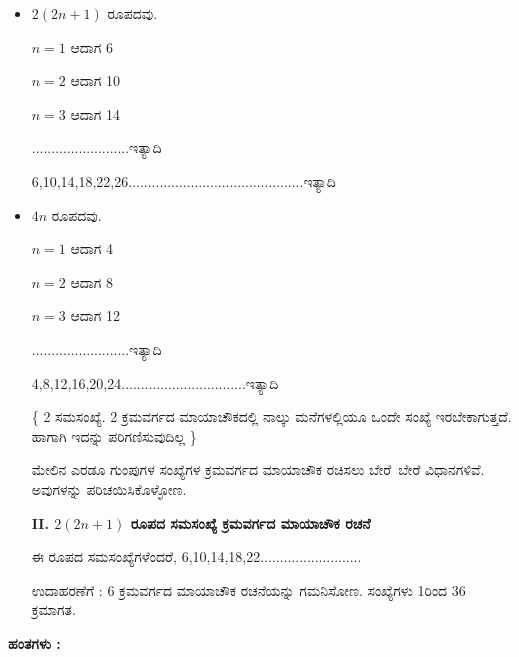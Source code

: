 \begin{itemize}
	\item $2 (2n+1)$ ರೂಪದವು.

	$n=1$ ಆದಾಗ 6

	$n=2$ ಆದಾಗ 10

	$n=3$ ಆದಾಗ 14

	.........................ಇತ್ಯಾದಿ

	6,10,14,18,22,26.............................................ಇತ್ಯಾದಿ
	\item $4n$ ರೂಪದವು. 

	$n=1$ ಆದಾಗ 4

	$n=2$ ಆದಾಗ 8

	$n=3$ ಆದಾಗ 12

	.........................ಇತ್ಯಾದಿ

	4,8,12,16,20,24................................ಇತ್ಯಾದಿ

	\{ 2 ಸಮಸಂಖ್ಯೆ. 2 ಕ್ರಮವರ್ಗದ ಮಾಯಾಚೌಕದಲ್ಲಿ ನಾಲ್ಕು ಮನೆಗಳಲ್ಲಿಯೂ ಒಂದೇ ಸಂಖ್ಯೆ ಇರಬೇಕಾಗುತ್ತದೆ. ಹಾಗಾಗಿ ಇದನ್ನು ಪರಿಗಣಿಸುವುದಿಲ್ಲ \}

	ಮೇಲಿನ ಎರಡೂ ಗುಂಪುಗಳ ಸಂಖ್ಯೆಗಳ ಕ್ರಮವರ್ಗದ ಮಾಯಾಚೌಕ ರಚಿಸಲು \hbox{ಬೇರೆ ಬೇರೆ} ವಿಧಾನಗಳಿವೆ. ಅವುಗಳನ್ನು ಪರಿಚಯಿಸಿಕೊಳ್ಳೋಣ.

	\textbf{II. $2 (2n+1)$ ರೂಪದ ಸಮಸಂಖ್ಯೆ  ಕ್ರಮವರ್ಗದ ಮಾಯಾಚೌಕ ರಚನೆ}

	ಈ ರೂಪದ ಸಮಸಂಖ್ಯೆಗಳೆಂದರೆ, 6,10,14,18,22..........................

	ಉದಾಹರಣೆಗೆ : 6 ಕ್ರಮವರ್ಗದ ಮಾಯಾಚೌಕ ರಚನೆಯನ್ನು ಗಮನಿಸೋಣ. ಸಂಖ್ಯೆ\-ಗಳು 1ರಿಂದ 36 ಕ್ರಮಾಗತ.
\end{itemize}

\textbf{ಹಂತಗಳು :}

